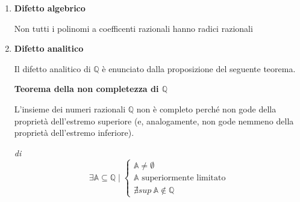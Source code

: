 \begin{enumerate}
\begin{demonstration}
            \qed
        \end{demonstration}

        \item \textbf{Difetto algebrico}
        
        Non tutti i polinomi a coefficenti razionali hanno radici razionali

        \begin{example} \leavevmode
        \end{example}

    \item \textbf{Difetto analitico}
    
    Il difetto analitico di $\mathbb{Q}$ è enunciato dalla proposizione del seguente teorema.

    \begin{theorem}
        \label{teo:non-com-raz}
        \textbf{Teorema della non completezza di $\mathbb{Q}$}

        L'insieme dei numeri razionali $\mathbb{Q}$ non è completo perché non gode della proprietà dell'estremo superiore
        (e, analogamente, non gode nemmeno della proprietà dell'estremo inferiore).
    \end{theorem}
    
    \begin{corollary}
        \textit{di} 
        \[
            \exists \mathbb{A} \subseteq \mathbb{Q} \mid
            \begin{cases}
                \mathbb{A}\neq\emptyset \\
                \mathbb{A} \text{ superiormente limitato}\\
                \nexists sup\:\mathbb{A} \notin \mathbb{Q} 
            \end{cases}
        \]
    \end{corollary}


\end{enumerate}
